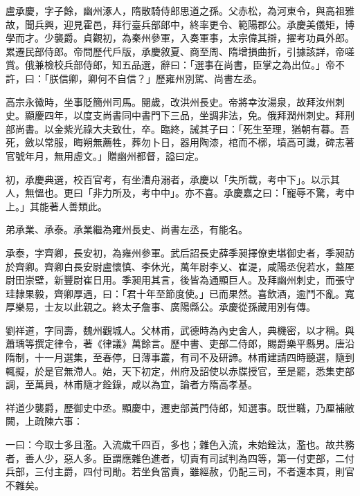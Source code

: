 \begin{pinyinscope}
 盧承慶，字子餘，幽州涿人，隋散騎侍郎思道之孫。父赤松，為河東令，與高祖雅故，聞兵興，迎見霍邑，拜行臺兵部郎中，終率更令、範陽郡公。承慶美儀矩，博學而才。少襲爵。貞觀初，為秦州參軍，入奏軍事，太宗偉其辯，擢考功員外郎。累遷民部侍郎。帝問歷代戶版，承慶敘夏、商至周、隋增損曲折，引據該詳，帝嗟賞。俄兼檢校兵部侍郎，知五品選，辭曰：「選事在尚書，臣掌之為出位。」帝不許，曰：「朕信卿，卿何不自信？」歷雍州別駕、尚書左丞。



 高宗永徽時，坐事貶簡州司馬。閱歲，改洪州長史。帝將幸汝湯泉，故拜汝州刺史。顯慶四年，以度支尚書同中書門下三品，坐調非法，免。俄拜潤州刺史。拜刑部尚書。以金紫光祿大夫致仕，卒。臨終，誡其子曰：「死生至理，猶朝有暮。吾死，斂以常服，晦朔無薦牲，葬勿卜日，器用陶漆，棺而不槨，墳高可識，碑志著官號年月，無用虛文。」贈幽州都督，謚曰定。



 初，承慶典選，校百官考，有坐漕舟溺者，承慶以「失所載，考中下」。以示其人，無慍也。更曰「非力所及，考中中」。亦不喜。承慶嘉之曰：「寵辱不驚，考中上。」其能著人善類此。



 弟承業、承泰。承業繼為雍州長史、尚書左丞，有能名。



 承泰，字齊卿，長安初，為雍州參軍。武后詔長史薛季昶擇僚吏堪御史者，季昶訪於齊卿。齊卿白長安尉盧懷慎、李休光，萬年尉李乂、崔湜，咸陽丞倪若水，盩厔尉田崇壁，新豐尉崔日用。季昶用其言，後皆為通顯巨人。及拜幽州刺史，而張守珪隸果毅，齊卿厚遇，曰：「君十年至節度使。」已而果然。喜飲酒，逾鬥不亂。寬厚樂易，士友以此親之。終太子詹事、廣陽縣公。承慶從孫藏用別有傳。



 劉祥道，字同壽，魏州觀城人。父林甫，武德時為內史舍人，典機密，以才稱。與蕭瑀等撰定律令，著《律議》萬餘言。歷中書、吏部二侍郎，賜爵樂平縣男。唐沿隋制，十一月選集，至春停，日薄事叢，有司不及研諦。林甫建請四時聽選，隨到輒擬，於是官無滯人。始，天下初定，州府及詔使以赤牒授官，至是罷，悉集吏部調，至萬員，林甫隨才銓錄，咸以為宜，論者方隋高孝基。



 祥道少襲爵，歷御史中丞。顯慶中，遷吏部黃門侍郎，知選事。既世職，乃厘補敝闕，上疏陳六事：



 一曰：今取士多且濫。入流歲千四百，多也；雜色入流，未始銓汰，濫也。故共務者，善人少，惡人多。臣謂應雜色進者，切責有司試判為四等，第一付吏部，二付兵部，三付主爵，四付司勛。若坐負當責，雖經赦，仍配三司，不者還本貫，則官不雜矣。




\end{pinyinscope}
